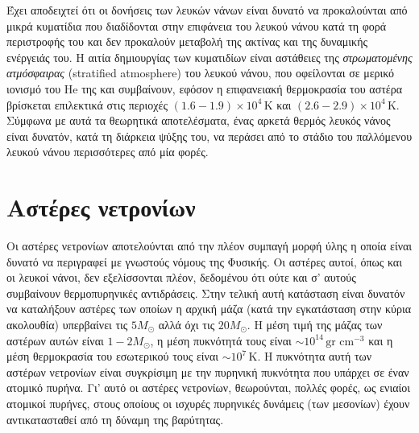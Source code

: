 Έχει αποδειχτεί ότι οι δονήσεις των λευκών νάνων είναι δυνατό να προκαλούνται από μικρά κυματίδια που διαδίδονται στην επιφάνεια του λευκού νάνου κατά τη φορά περιστροφής του και δεν προκαλούν μεταβολή της ακτίνας και της δυναμικής ενέργειάς του. Η αιτία δημιουργίας των κυματιδίων είναι αστάθειες της \textit{στρωματομένης ατμόσφαιρας} (stratified atmosphere) του λευκού νάνου,  που οφείλονται σε μερικό ιονισμό του He της και συμβαίνουν, εφόσον η επιφανειακή θερμοκρασία του αστέρα βρίσκεται επιλεκτικά στις περιοχές $(1.6 - 1.9) \times 10^4\,\text{K}$ και $(2.6 - 2.9) \times 10^4\,\text{K}$. Σύμφωνα με αυτά τα θεωρητικά αποτελέσματα, ένας αρκετά θερμός λευκός νάνος είναι δυνατόν, κατά τη διάρκεια ψύξης του, να περάσει από το στάδιο του παλλόμενου λευκού νάνου περισσότερες από μία φορές.





\section{Αστέρες νετρονίων}
Οι αστέρες νετρονίων αποτελούνται από την πλέον συμπαγή μορφή ύλης η οποία είναι δυνατό να περιγραφεί με γνωστούς νόμους της Φυσικής. Οι αστέρες αυτοί, όπως και οι λευκοί νάνοι, δεν εξελίσσονται πλέον, δεδομένου ότι ούτε και σ' αυτούς συμβαίνουν θερμοπυρηνικές αντιδράσεις. Στην τελική αυτή κατάσταση είναι δυνατόν να καταλήξουν αστέρες των οποίων η αρχική μάζα (κατά την εγκατάσταση στην κύρια ακολουθία) υπερβαίνει τις $5 M_\odot$ αλλά όχι τις $20 M_\odot$. Η μέση τιμή της μάζας των αστέρων αυτών είναι $1 - 2 M_\odot$, η μέση πυκνότητά τους είναι $\sim 10^{14}\,\text{gr cm}^{-3}$ και η μέση θερμοκρασία του εσωτερικού τους είναι $\sim 10^7\,\text{K}$. Η πυκνότητα αυτή των αστέρων νετρονίων είναι συγκρίσιμη με την πυρηνική πυκνότητα που υπάρχει σε έναν ατομικό πυρήνα. Γι' αυτό οι αστέρες νετρονίων, θεωρούνται, πολλές φορές, ως ενιαίοι ατομικοί πυρήνες, στους οποίους οι ισχυρές πυρηνικές δυνάμεις (των μεσονίων) έχουν αντικατασταθεί από τη δύναμη της βαρύτητας.

